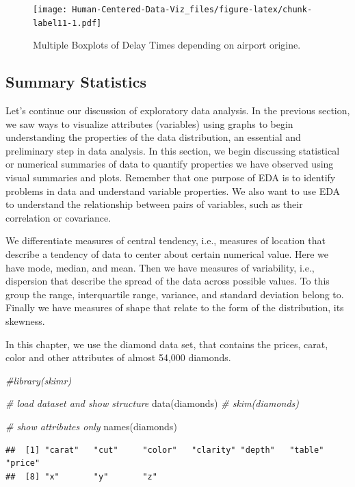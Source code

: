 \documentclass[
]{book}
\newenvironment{Shaded}{\begin{snugshade}}{\end{snugshade}}
\newcommand{\CommentTok}[1]{\textcolor[rgb]{0.56,0.35,0.01}{\textit{#1}}}
\newcommand{\FunctionTok}[1]{\textcolor[rgb]{0.00,0.00,0.00}{#1}}
\newcommand{\NormalTok}[1]{#1}
\begin{document}
\begin{figure}
\centering
\texttt{[image: Human-Centered-Data-Viz\_files/figure-latex/chunk-label11-1.pdf]}
\caption{\label{fig:chunk-label11}Multiple Boxplots of Delay Times depending on airport origine.}
\end{figure}

\hypertarget{summary-statistics}{%
\subsection{Summary Statistics}\label{summary-statistics}}

Let's continue our discussion of exploratory data analysis. In the previous section, we saw ways to visualize attributes (variables) using graphs to begin understanding the properties of the data distribution, an essential and preliminary step in data analysis. In this section, we begin discussing statistical or numerical summaries of data to quantify properties we have observed using visual summaries and plots. Remember that one purpose of EDA is to identify problems in data and understand variable properties. We also want to use EDA to understand the relationship between pairs of variables, such as their correlation or covariance.

We differentiate measures of central tendency, i.e., measures of location that describe a tendency of data to center about certain numerical value. Here we have mode, median, and mean. Then we have measures of variability, i.e., dispersion that describe the spread of the data across possible values. To this group the range, interquartile range, variance, and standard deviation belong to. Finally we have measures of shape that relate to the form of the distribution, its skewness.

In this chapter, we use the diamond data set, that contains the prices, carat, color and other attributes of almost 54,000 diamonds.

\begin{Shaded}
\begin{Highlighting}[]
\CommentTok{\#library(skimr)}

\CommentTok{\# load dataset and show structure}
\FunctionTok{data}\NormalTok{(diamonds)}
\CommentTok{\# skim(diamonds)}

\CommentTok{\# show attributes only}
\FunctionTok{names}\NormalTok{(diamonds)}
\end{Highlighting}
\end{Shaded}

\begin{verbatim}
##  [1] "carat"   "cut"     "color"   "clarity" "depth"   "table"   "price"  
##  [8] "x"       "y"       "z"
\end{verbatim}
\end{document}
